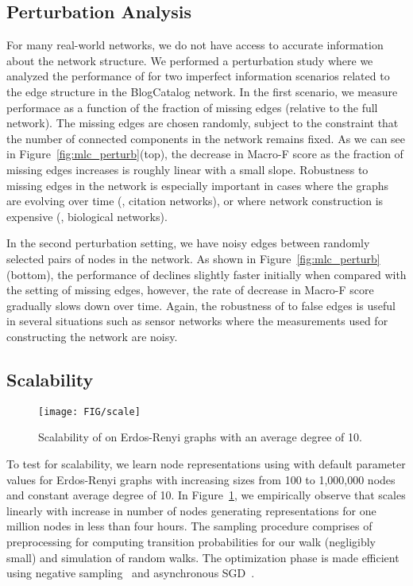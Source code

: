  
\subsection{Perturbation Analysis}
For many real-world networks, we do not have access to accurate information about the network structure. We performed a perturbation study where we analyzed the performance of \nodevec for two imperfect information scenarios related to the edge structure in the BlogCatalog network. In the first scenario, we measure performace as a function of the fraction of missing edges (relative to the full network). The missing edges are chosen randomly, subject to the constraint that the number of connected components in the network remains fixed. As we can see in Figure~\ref{fig:mlc_perturb}(top), the decrease in Macro-F score as the fraction of missing edges increases is roughly linear with a small slope. Robustness to missing edges in the network is especially important in cases where the graphs are evolving over time (\eg, citation networks), or where network construction is expensive (\eg, biological networks). 

In the second perturbation setting, we have noisy edges between randomly selected pairs of nodes in the network. As shown in Figure~\ref{fig:mlc_perturb}(bottom), the performance of \nodevec declines slightly faster initially when compared with the setting of missing edges, however, the rate of decrease in Macro-F score gradually slows down over time. Again, the robustness of \nodevec to false edges is useful in several situations such as sensor networks where the measurements used for constructing the network are noisy.

 

\subsection{Scalability}
\begin{figure}[t]
\centering
\texttt{[image: FIG/scale]}
\vspace{-0.5cm}
\caption{Scalability of \nodevec on Erdos-Renyi graphs with an average degree of 10.}\label{fig:scale}
\vspace{-0.6cm}
\end{figure}

To test for scalability, we learn node representations using \nodevec with default parameter values for Erdos-Renyi graphs with increasing sizes from 100 to 1,000,000 nodes and constant average degree of 10. In Figure~\ref{fig:scale}, we empirically observe that \nodevec scales linearly with increase in number of nodes generating representations for one million nodes in less than four hours. The sampling procedure comprises of preprocessing for computing transition probabilities for our walk (negligibly small) and simulation of random walks. The optimization phase is made efficient using negative sampling~\cite{word2vec2} and asynchronous SGD~\cite{recht-nips2011}. 

